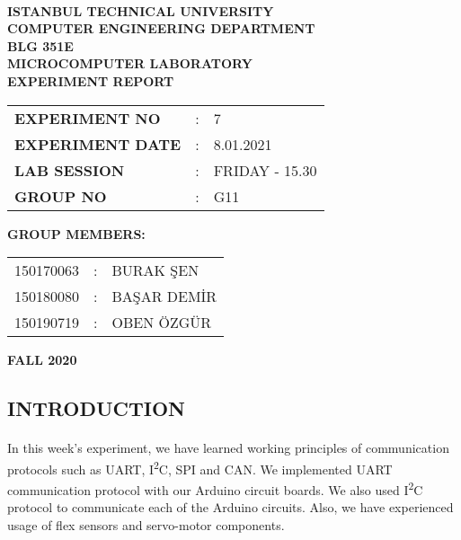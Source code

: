 \documentclass[pdftex,12pt,a4paper]{article}
\begin{document}
\begin{titlepage}
\begin{center}
\textbf{}\\
\textbf{\Large{ISTANBUL TECHNICAL UNIVERSITY}}\\
\vspace{0.5cm}
\textbf{\Large{COMPUTER ENGINEERING DEPARTMENT}}\\
\vspace{2cm}
\textbf{\Large{BLG 351E\\ MICROCOMPUTER LABORATORY\\ EXPERIMENT REPORT}}\\
\vspace{2.8cm}
\begin{table}[ht]
\centering
\Large{
\begin{tabular}{lcl}
\textbf{EXPERIMENT NO}  & : & 7 \\
\textbf{EXPERIMENT DATE}  & : & 8.01.2021 \\
\textbf{LAB SESSION}  & : & FRIDAY - 15.30 \\
\textbf{GROUP NO}  & : & G11 \\
\end{tabular}}
\end{table}
\vspace{1cm}
\textbf{\Large{GROUP MEMBERS:}}\\
\begin{table}[ht]
\centering
\Large{
\begin{tabular}{rcl}
150170063 & : & BURAK ŞEN \\
150180080  & : & BAŞAR DEMİR \\
150190719  & : & OBEN ÖZGÜR \\
\end{tabular}}
\end{table}
\vspace{2.8cm}
\textbf{\Large{FALL 2020}}

\end{center}

\end{titlepage}

\thispagestyle{empty}
\setcounter{tocdepth}{4}
\tableofcontents
\clearpage
\setcounter{page}{1}
\newpage
\begin{flushleft}
\section{INTRODUCTION}
\paragraph{}
In this week's experiment, we have learned working principles of communication protocols such as UART, I\textsuperscript{2}C, SPI and CAN. We implemented UART communication protocol with our Arduino circuit boards. We also used I\textsuperscript{2}C protocol to communicate each of the Arduino circuits. Also, we have experienced usage of flex sensors and servo-motor components.
\end{flushleft} 
\end{document}
